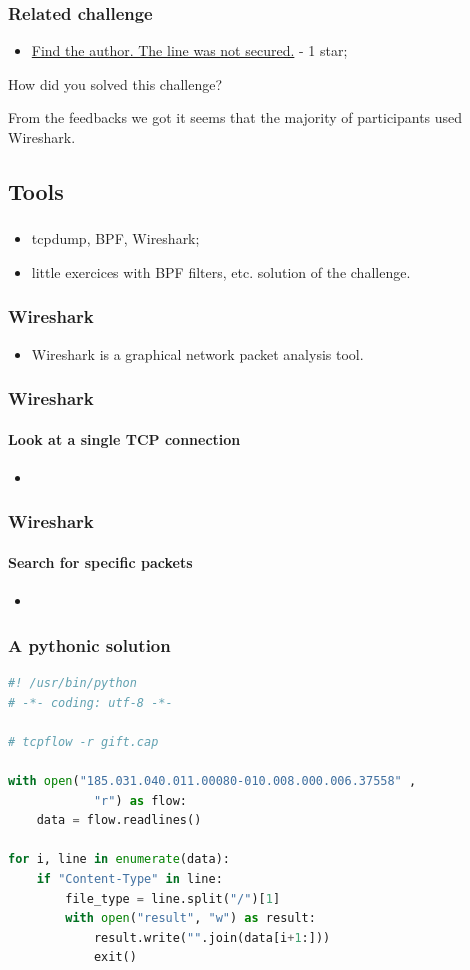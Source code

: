 \documentclass[]{beamer}
\begin{document}
\begin{frame}
\frametitle{Related challenge}
\begin{itemize}
    \item \href{https://github.com/cscluxembourg/vestatech/blob/master/challenges/find-the-author/gift.cap}{Find the author. The line was not secured.} - 1 star;
\end{itemize}
\bigskip
How did you solved this challenge?

\bigskip
From the feedbacks we got it seems that the majority of participants used Wireshark.
\end{frame}




\subsection{Tools}
\begin{frame}
\frametitle{}
\begin{itemize}
\item tcpdump, BPF, Wireshark;
\item little exercices with BPF filters, etc. solution of the challenge.
\end{itemize}
\end{frame}

\begin{frame}
\frametitle{Wireshark}
\begin{itemize}
\item Wireshark is a graphical network packet analysis tool.
\end{itemize}
\end{frame}

\begin{frame}
\frametitle{Wireshark}
\framesubtitle{Look at a single TCP connection}
\begin{itemize}
\item
\end{itemize}
\end{frame}

\begin{frame}
\frametitle{Wireshark}
\framesubtitle{Search for specific packets}
\begin{itemize}
\item
\end{itemize}
\end{frame}


\begin{frame}[fragile]
\frametitle{A pythonic solution}
\begin{lstlisting}[language=Python]
#! /usr/bin/python
# -*- coding: utf-8 -*-

# tcpflow -r gift.cap

with open("185.031.040.011.00080-010.008.000.006.37558" ,
            "r") as flow:
    data = flow.readlines()

for i, line in enumerate(data):
    if "Content-Type" in line:
        file_type = line.split("/")[1]
        with open("result", "w") as result:
            result.write("".join(data[i+1:]))
            exit()
\end{lstlisting}
\end{frame}
 
\end{document}

